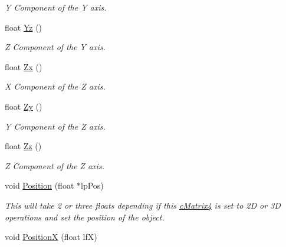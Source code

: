 \begin{DoxyCompactItemize}
\begin{DoxyCompactList}\small\item\em Y Component of the Y axis. \end{DoxyCompactList}\item 
\hypertarget{classc_matrix4_ad81766f34027dcc5d22d45b927275280}{
float \hyperlink{classc_matrix4_ad81766f34027dcc5d22d45b927275280}{Yz} ()}
\label{classc_matrix4_ad81766f34027dcc5d22d45b927275280}

\begin{DoxyCompactList}\small\item\em Z Component of the Y axis. \end{DoxyCompactList}\item 
\hypertarget{classc_matrix4_a12829c26cfd157917540d7389345a56a}{
float \hyperlink{classc_matrix4_a12829c26cfd157917540d7389345a56a}{Zx} ()}
\label{classc_matrix4_a12829c26cfd157917540d7389345a56a}

\begin{DoxyCompactList}\small\item\em X Component of the Z axis. \end{DoxyCompactList}\item 
\hypertarget{classc_matrix4_a0c2541f2d0050322f2c28e1c5efce327}{
float \hyperlink{classc_matrix4_a0c2541f2d0050322f2c28e1c5efce327}{Zy} ()}
\label{classc_matrix4_a0c2541f2d0050322f2c28e1c5efce327}

\begin{DoxyCompactList}\small\item\em Y Component of the Z axis. \end{DoxyCompactList}\item 
\hypertarget{classc_matrix4_a7d4ef2375b3a6bf5a3d9728aee1ba752}{
float \hyperlink{classc_matrix4_a7d4ef2375b3a6bf5a3d9728aee1ba752}{Zz} ()}
\label{classc_matrix4_a7d4ef2375b3a6bf5a3d9728aee1ba752}

\begin{DoxyCompactList}\small\item\em Z Component of the Z axis. \end{DoxyCompactList}\item 
\hypertarget{classc_matrix4_ae3bb670db30cee45d59aef1599289086}{
void \hyperlink{classc_matrix4_ae3bb670db30cee45d59aef1599289086}{Position} (float $\ast$lpPos)}
\label{classc_matrix4_ae3bb670db30cee45d59aef1599289086}

\begin{DoxyCompactList}\small\item\em This will take 2 or three floats depending if this \hyperlink{classc_matrix4}{cMatrix4} is set to 2D or 3D operations and set the position of the object. \end{DoxyCompactList}\item 
\hypertarget{classc_matrix4_adf27db7265e42ccbbb5a6779800c39ea}{
void \hyperlink{classc_matrix4_adf27db7265e42ccbbb5a6779800c39ea}{PositionX} (float lfX)}
\label{classc_matrix4_adf27db7265e42ccbbb5a6779800c39ea}


\end{DoxyCompactItemize}
